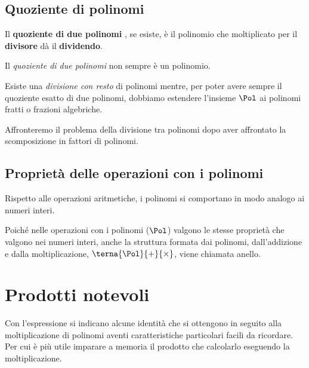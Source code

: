\subsection{Quoziente di polinomi}
\label{subsec:poli_quoziente}

\begin{definizione}{}{}
Il \textbf{quoziente di due polinomi}
, se esiste, è il 
polinomio che moltiplicato per il \textbf{divisore} dà il \textbf{dividendo}.
\end{definizione}

\begin{osservazione}{}{}
Il \emph{quoziente di due polinomi} non sempre è un polinomio.

Esiste una \emph{divisione con resto} di polinomi mentre, 
per poter avere sempre il quoziente esatto di due polinomi, 
dobbiamo estendere l'insieme \(\Pol\) ai 
polinomi fratti o frazioni algebriche.
\end{osservazione}

Affronteremo il problema della divisione tra polinomi dopo aver 
affrontato la scomposizione in fattori di polinomi.


\subsection{Proprietà delle operazioni con i polinomi}
\label{subsec:poli_proprieta}

\begin{osservazione}{}{}
Rispetto alle operazioni aritmetiche, i polinomi si comportano in modo 
analogo ai numeri interi. 
\end{osservazione}

Poiché nelle operazioni con i polinomi (\(\Pol\)) valgono le stesse 
proprietà che valgono nei numeri interi, anche la struttura formata dai 
polinomi, dall'addizione e dalla moltiplicazione, 
\(\terna{\Pol}{+}{\times}\), viene chiamata anello.

\section{Prodotti notevoli}
\label{sec:poli_prodnot}

Con l'espressione  si 
indicano alcune identità che si ottengono in seguito alla moltiplicazione 
di polinomi aventi caratteristiche particolari facili da ricordare.
Per cui è più utile imparare a memoria il prodotto che calcolarlo 
eseguendo la moltiplicazione.


